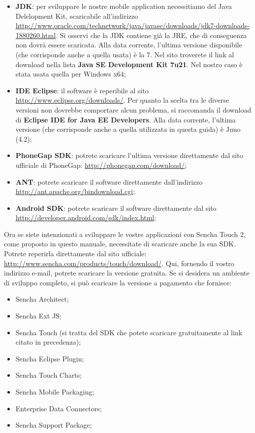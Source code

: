 \documentclass[10pt,a4paper,onecolumn]{article}
\begin{document}
\begin{itemize}
	\item \textbf{JDK}: per sviluppare le nostre mobile application necessitiamo del Java Delelopment Kit, scaricabile all'indirizzo \url{http://www.oracle.com/technetwork/java/javase/downloads/jdk7-downloads-1880260.html}. Si osservi che la JDK contiene già la JRE, che di conseguenza non dovrà essere scaricata. Alla data corrente, l'ultima versione disponibile (che corrisponde anche a quella usata) è la 7. Nel sito troverete il link al download nella lista \textbf{Java SE Development Kit 7u21}. Nel nostro caso è stata usata quella per  Windows x64;
	\item \textbf{IDE Eclipse}: il software è reperibile al sito \url{http://www.eclipse.org/downloads/}. Per quanto la scelta tra le diverse versioni non dovrebbe comportare alcun problema, si raccomanda il download di \textbf{Eclipse IDE for Java EE Developers}. Alla data corrente, l'ultima versione (che corrisponde anche a quella utilizzata in questa guida) è Juno (4.2);
	\item \textbf{PhoneGap SDK}: potrete scaricare l'ultima versione  direttamente dal sito ufficiale di PhoneGap: \url{http://phonegap.com/download/};
	\item \textbf{ANT}: potrete scaricare il software direttamente dall'indirizzo \url{http://ant.apache.org/bindownload.cgi};
	\item \textbf{Android SDK}: potrete scaricare il software direttamente dal sito \url{http://developer.android.com/sdk/index.html};
\end{itemize}

Ora se siete intenzionati a sviluppare le vostre applicazioni con Sencha Touch 2, come proposto in questo manuale, necessitate di scaricare anche la sua SDK. Potrete reperirla direttamente dal sito ufficiale: \url{http://www.sencha.com/products/touch/download/}. Qui, fornendo il vostro indirizzo e-mail, potrete scaricare la versione gratuita. Se si desidera un ambiente di sviluppo completo, si può scaricare la versione a pagamento che fornisce:
\begin{itemize}
	\item Sencha Architect;
	\item Sencha Ext JS;
	\item Sencha Touch (si tratta del SDK che potete scaricare gratuitamente al link citato in precedenza);
	\item Sencha Eclipse Plugin;
	\item Sencha Touch Charts;
	\item Sencha Mobile Packaging;
	\item Enterprise Data Connectors;
	\item Sencha Support Package;
\end{itemize}
\end{document}
